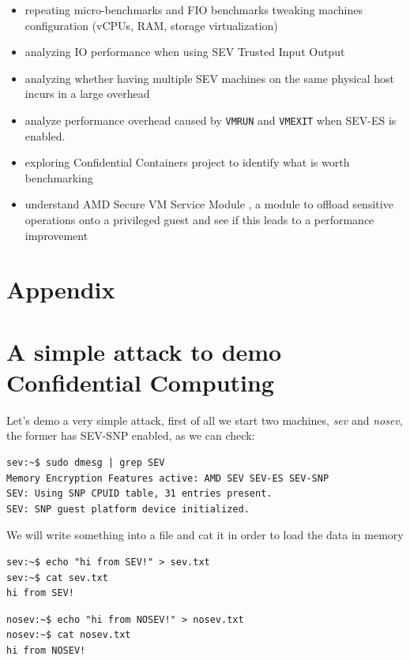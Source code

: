 \documentclass[twocolumn]{article}
\begin{document}
    \begin{itemize}
        \item repeating micro-benchmarks and FIO benchmarks tweaking machines configuration (vCPUs, RAM, storage virtualization)
        \item analyzing IO performance when using SEV Trusted Input Output \cite{tio}
        \item analyzing whether having multiple SEV machines on the same physical host incurs in a large overhead
        \item analyze performance overhead caused by \texttt{VMRUN} and \texttt{VMEXIT} when SEV-ES is enabled.
        \item exploring Confidential Containers \cite{coco} project to identify what is worth benchmarking
        \item understand AMD Secure VM Service Module \cite{svsm}, a module to offload sensitive operations onto a privileged guest and see if this leads to a performance improvement
    \end{itemize}

    
\printbibliography
\appendix

\section*{Appendix}
    \section{A simple attack to demo Confidential Computing}
    Let's demo a very simple attack, first of all we start two machines, \textit{sev} and \textit{nosev}, the former has SEV-SNP enabled, as we can check:

    \begin{verbatim}
sev:~$ sudo dmesg | grep SEV
Memory Encryption Features active: AMD SEV SEV-ES SEV-SNP
SEV: Using SNP CPUID table, 31 entries present.
SEV: SNP guest platform device initialized.
    \end{verbatim}

    We will write something into a file and cat it in order to load the data in memory

    \begin{verbatim}
sev:~$ echo "hi from SEV!" > sev.txt
sev:~$ cat sev.txt
hi from SEV!
    \end{verbatim}

    \begin{verbatim}
nosev:~$ echo "hi from NOSEV!" > nosev.txt
nosev:~$ cat nosev.txt
hi from NOSEV!
    \end{verbatim}
\end{document}

